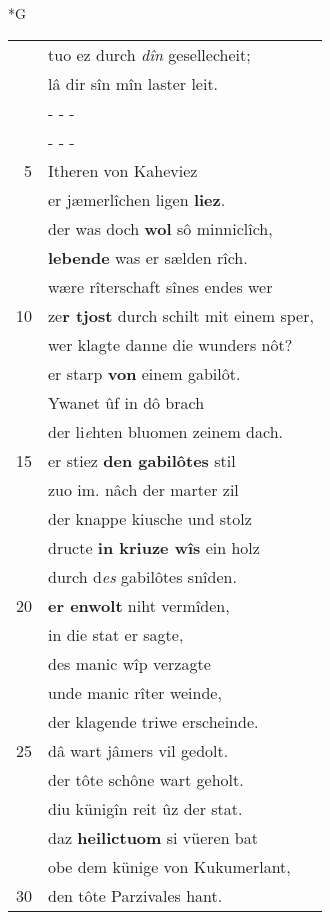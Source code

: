 \documentclass[8pt,a4paper,notitlepage]{article}
\begin{document}
\begin{table}[ht]
\begin{minipage}[t]{0.5\linewidth}
\small
\begin{center}*G
\end{center}
\begin{tabular}{rl}
 & tuo ez durch \textit{dîn} gesellecheit;\\ 
 & lâ dir sîn mîn laster leit.\\ 
 & \multicolumn{1}{l}{ - - - }\\ 
 & \multicolumn{1}{l}{ - - - }\\ 
5 & Itheren von Kaheviez\\ 
 & er jæmerlîchen ligen \textbf{liez}.\\ 
 & der was doch \textbf{wol} sô minniclîch,\\ 
 & \textbf{lebende} was er sælden rîch.\\ 
 & wære rîterschaft sînes endes wer\\ 
10 & ze\textbf{r tjost} durch schilt mit einem sper,\\ 
 & wer klagte danne die wunders nôt?\\ 
 & er starp \textbf{von} einem gabilôt.\\ 
 & Ywanet ûf in dô brach\\ 
 & der li\textit{e}hten bluomen zeinem dach.\\ 
15 & er stiez \textbf{den gabilôtes} stil\\ 
 & zuo im. nâch der marter zil\\ 
 & der knappe kiusche und stolz\\ 
 & dructe \textbf{in kriuze wîs} ein holz\\ 
 & durch d\textit{es} gabilôtes snîden.\\ 
20 & \textbf{er enwolt} niht vermîden,\\ 
 & in die stat er sagte,\\ 
 & des manic wîp verzagte\\ 
 & unde manic rîter weinde,\\ 
 & der klagende triwe erscheinde.\\ 
25 & dâ wart jâmers vil gedolt.\\ 
 & der tôte schône wart geholt.\\ 
 & diu künigîn reit ûz der stat.\\ 
 & daz \textbf{heilictuom} si vüeren bat\\ 
 & obe dem künige von Kukumerlant,\\ 
30 & den tôte Parzivales hant.\\ 

\end{tabular}
\end{minipage}
\end{table}
\end{document}
